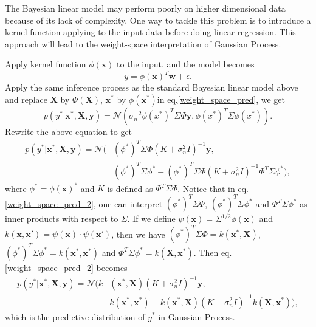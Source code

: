 \documentclass[11pt,a4paper]{article}
\theoremstyle{definition}
\numberwithin{equation}{section}
\let\vec\mathbf
\begin{document}
	The Bayesian linear model may perform poorly on higher dimensional data because of its  lack of complexity. One way to tackle this problem is to introduce a kernel function applying to the input data before doing linear regression. This approach will lead to the weight-space interpretation of Gaussian Process.
	
	Apply kernel function $\phi(\vec x)$ to the input, and the model becomes
	\begin{equation}
	y = \phi(\vec x)^T\vec w + \epsilon.
	\end{equation}
	Apply the same inference process as the standard Bayesian linear model above and replace $\vec X$ by $\Phi(\vec X)$, $\vec x^*$ by $\phi(\vec x^*)$in eq.\ref{weight_space_pred}, we get
	\begin{equation}
	p(y^*|\vec x^*,\vec X, \vec y) =\mathcal N\left(\sigma^{-2}_n\phi(x^*)^{T}\bar\Sigma\Phi \vec y,\phi(x^*)^{T}\bar\Sigma\phi(x^*)\right).
	\end{equation}
	Rewrite the above equation to get
	\begin{equation}\label{weight_space_pred_2}
	\begin{split}
	p(y^*|\vec x^*,\vec X, \vec y) =\mathcal N( &(\phi^*)^T\Sigma\Phi(K+\sigma^2_nI)^{-1}\vec y,\\
	&(\phi^*)^T\Sigma\phi^*- (\phi^*)^T\Sigma\Phi(K+\sigma^2_nI)^{-1}\Phi^T\Sigma \phi^*),
	\end{split}
	\end{equation}
	where $\phi^*=\phi(\vec x)^*$ and $K$ is defined as $\Phi^T\Sigma\Phi$.
	Notice that in eq.\ref{weight_space_pred_2}, one can interpret $(\phi^*)^T\Sigma\Phi$, $(\phi^*)^T\Sigma\phi^*$ and $\Phi^T\Sigma \phi^*$ as inner products with respect to $\Sigma$. If we define $\psi(\vec x) = \Sigma^{1/2}\phi(\vec x)$ and $k(\vec x,\vec x')=\psi(\vec x) \cdot \psi(\vec x') $, then we have $(\phi^*)^T\Sigma\Phi = k(\vec x^*,\vec X)$, $(\phi^*)^T\Sigma\phi^* = k(\vec x^*,\vec x^*)$ and $\Phi^T\Sigma \phi^* = k(\vec X,\vec x^*)$. Then eq. \ref{weight_space_pred_2} becomes
	\begin{equation}\label{weight_pred}
	\begin{split}
	p(y^*|\vec x^*,\vec X, \vec y) =\mathcal N(k&(\vec x^*,\vec X)(K+\sigma^2_nI)^{-1}\vec y,\\
	&k(\vec x^*,\vec x^*)- k(\vec x^*,\vec X)(K+\sigma^2_nI)^{-1}k(\vec X,\vec x^*)),
	\end{split}
	\end{equation}
	which is the predictive distribution of $y^*$ in Gaussian Process. 
	
\end{document}
